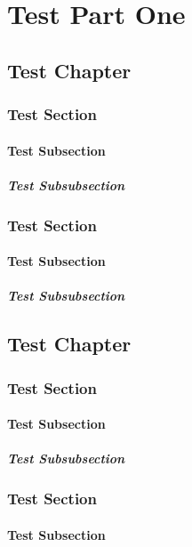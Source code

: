 \documentclass{report}
\begin{document}
\doparttoc
\dominitoc
\tableofcontents

\part{Test Part One}
\parttoc
\chapter{Test Chapter}
\section{Test Section}
\subsection{Test Subsection}
\subsubsection{Test Subsubsection}
\section{Test Section}
\subsection{Test Subsection}
\subsubsection{Test Subsubsection}
\chapter{Test Chapter}
\minitoc
\section{Test Section}
\subsection{Test Subsection}
\subsubsection{Test Subsubsection}
\section{Test Section}
\subsection{Test Subsection}
\end{document}
